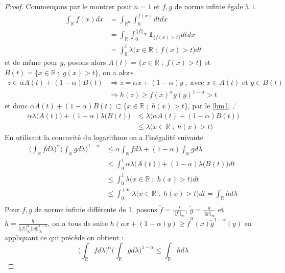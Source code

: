 \documentclass[12pt]{article}
\theoremstyle{definition}
\begin{document}
\begin{proof}
	Commençons par le montrer pour $n=1$ et $f,g$ de norme infinie égale à $1$.
	\begin{align*}
	\int_{\mathbb{R}}f(x) dx &=\int_{\mathbb{R}^n}\int_{0}^{f(x)}dt dx\\
	&=\int_{\mathbb{R}}\int_{0}^{||f||_\infty}\mathbb{1}_{\{f(x)>t\}} dt dx\\
	&=\int_{0}^{1}\lambda\big(x\in\mathbb{R}\;;\;f(x)>t\big)dt
	\end{align*}
	et de même pour $g$, posons alors $A(t)=\Big\{x\in\mathbb{R}\;;\;f(x)>t\Big\}$ et $B(t)= \Big\{x\in\mathbb{R}\;;\;g(x)>t\Big\}$, on a alors 
	\begin{align*}
	z\in \alpha A(t) + (1-\alpha)B(t) &\Rightarrow z=\alpha x +(1-\alpha)y \; , \; \text{avec $x\in A(t)$ et $y\in B(t)$}\\
	&\Rightarrow h(z)\geq f(x)^{\alpha}g(y)^{1-\alpha}>t
	\end{align*}
	et donc $\alpha A(t) + (1-\alpha)B(t)\subset \Big\{x\in\mathbb{R}\;;\;h(x)>t\Big\}$, par le \cref{bm1} ,`
	\begin{align*}
	\alpha\lambda\big(A(t)\big)+(1-\alpha)\lambda(B(t)\big)&\leq \lambda\Big(\alpha A(t) + (1-\alpha)B(t)\Big)\\
	&\leq \lambda\Big(x\in\mathbb{R}\;;\; h(x)>t\Big)
	\end{align*}
	En utilisant la concavité du logarithme on a l'inégalité suivante 
	\begin{align*}
	\Big(\int_{\mathbb{R}}fd\lambda\Big)^{\alpha}\Big(\int_{\mathbb{R}}g d\lambda\Big)^{1-\alpha}&\leq \alpha \int_{\mathbb{R}}fd\lambda +(1-\alpha)\int_{\mathbb{R}}g d\lambda\\
	&\leq \int_{0}^{1}\alpha\lambda\big(A(t)\big)+(1-\alpha)\lambda\big(B(t)\big)dt\\
	&\leq \int_{0}^{1}\lambda\Big(x\in\mathbb{R}\;;\; h(x)>t\Big)dt\\
	&\leq \int_{0}^{+\infty}\lambda\Big(x\in\mathbb{R}\;;\; h(x)>t\Big)dt=\int_{\mathbb{R}}hd\lambda\\
	\end{align*}
	Pour $f,g$ de norme infinie différente de 1, posons $\tilde{f}=\frac{f}{||f||_\infty}$, $\tilde{g}=\frac{g}{||g||_\infty}$ et $\tilde{h}=\frac{h}{||f||_\infty^{\alpha}||g||_\infty^{1-\alpha}}$, on a tous de suite $\tilde{h}\left(\alpha x + (1-\alpha)y\right)\geq \tilde{f}^{\alpha}(x)\tilde{g}^{1-\alpha}(y)$ en appliquant ce qui précède on obtient :
	\begin{equation*}
	\Big(\int_{\mathbb{R}}fd\lambda\Big)^{\alpha}\Big(\int_{\mathbb{R}}g d\lambda\Big)^{1-\alpha}\leq \int_{\mathbb{R}}hd\lambda

\end{equation*}
\end{proof}
\end{document}
